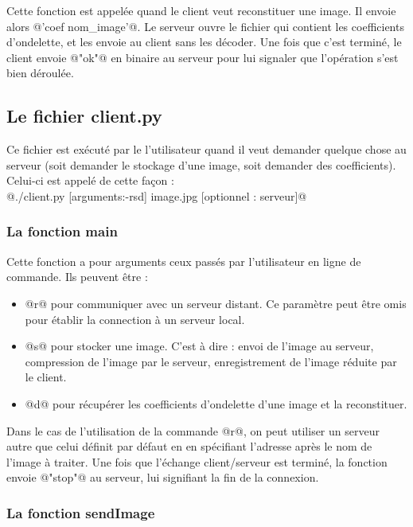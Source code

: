 \documentclass{article}
\begin{document}
Cette fonction est appelée quand le client veut reconstituer une image. Il envoie alors @'coef nom_image'@. Le serveur ouvre le fichier qui contient les coefficients d'ondelette, et les envoie au client sans les décoder. Une fois que c'est terminé, le client envoie @"ok"@ en binaire au serveur pour lui signaler que l'opération s'est bien déroulée.

\subsection{Le fichier client.py}

Ce fichier est exécuté par le l'utilisateur quand il veut demander quelque chose au serveur (soit demander le stockage d'une image, soit demander des coefficients). Celui-ci est appelé de cette façon : \\ @./client.py [arguments:-rsd] image.jpg [optionnel : serveur]@

\subsubsection{La fonction main}

Cette fonction a pour arguments ceux passés par l'utilisateur en ligne de commande. Ils peuvent être :

\begin{itemize}
\item @r@ pour communiquer avec un serveur distant. Ce paramètre peut être omis pour établir la connection à un serveur local.

\item @s@ pour stocker une image. C'est à dire : envoi de l'image au serveur, compression de l'image par le serveur, enregistrement de l'image réduite par le client.

\item @d@ pour récupérer les coefficients d'ondelette d'une image et la reconstituer.

\end{itemize}


Dans le cas de l'utilisation de la commande @r@, on peut utiliser un serveur autre que celui définit par défaut en en spécifiant l'adresse après le nom de l'image à traiter. Une fois que l'échange client/serveur est terminé, la fonction envoie @"stop"@ au serveur, lui signifiant la fin de la connexion.

\subsubsection{La fonction sendImage}
\end{document}

